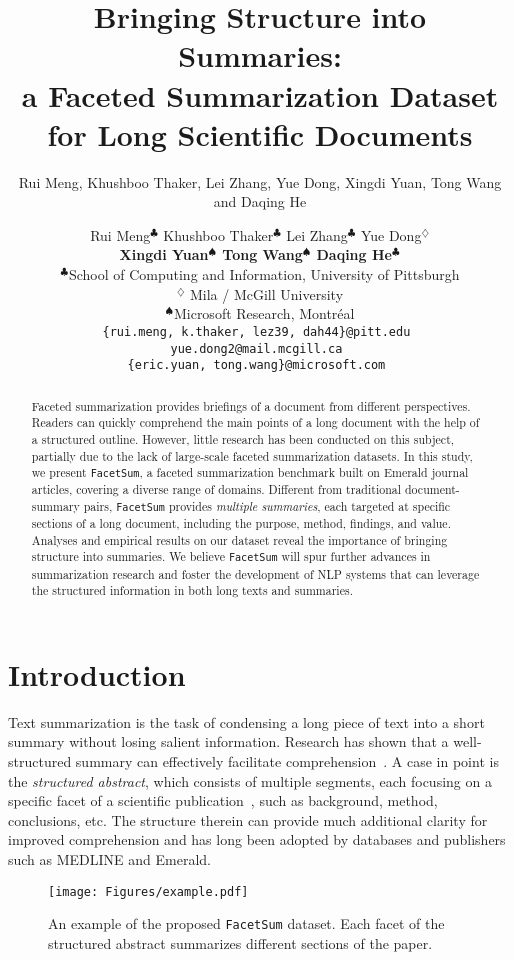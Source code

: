 \documentclass[11pt,a4paper]{article}
\title{Bringing Structure into Summaries: \\ a Faceted Summarization Dataset for Long Scientific Documents}
\author{Rui Meng, Khushboo Thaker, Lei Zhang, Yue Dong, Xingdi Yuan, Tong Wang and Daqing He}
\author{Rui Meng$^\clubsuit$ \:\:\:\: Khushboo Thaker$^{\clubsuit}$ \:\:\:\: Lei Zhang$^{\clubsuit}$ \:\:\:\: Yue Dong$^{\diamondsuit}$ \:\:\:\: \\ \textbf{Xingdi Yuan$^\spadesuit$ \:\:\:\: Tong Wang$^{\spadesuit}$ \:\:\:\: Daqing He}$^{\clubsuit}$\\
$^\clubsuit$School of Computing and Information, University of Pittsburgh \\
$^\diamondsuit$ Mila / McGill University \\
$^\spadesuit$Microsoft Research, Montr\'{e}al \\
{\small \tt \{rui.meng, k.thaker, lez39, dah44\}@pitt.edu } \\
{\small \tt yue.dong2@mail.mcgill.ca } \\
{\small \tt \{eric.yuan, tong.wang\}@microsoft.com }
}
\date{}
\newcommand{\ours}{\texttt{FacetSum}\xspace}
\begin{document}
\maketitle

\begin{abstract}
Faceted summarization provides briefings of a document from different perspectives. Readers can quickly comprehend the main points of a long document with the help of a structured outline. However, little research has been conducted on this subject, partially due to the lack of large-scale faceted summarization datasets.
In this study, we present \ours, a faceted summarization benchmark built on Emerald journal articles, covering a diverse range of domains.
Different from traditional document-summary pairs, \ours provides \textit{multiple summaries}, each targeted at specific sections
of a long document, including the purpose, method, findings, and value.
Analyses and empirical results on our dataset reveal the importance of bringing structure into summaries.
We believe \ours will spur further advances in summarization research and foster the development of NLP systems that can leverage the structured information in both long texts and summaries.






\end{abstract}

\section{Introduction}
\label{section:intro}








Text summarization is the task of condensing a long piece of text into a short summary without losing salient information.
Research has shown that a well-structured summary 
can effectively facilitate comprehension~\cite{hartley1996obtaining,hartley1997structured}.
A case in point is the \textit{structured abstract}, which consists of multiple segments, each focusing on a specific facet of a scientific publication~\cite{hartley2014current}, such as background, method, conclusions, etc.
The structure therein can provide much additional clarity for improved comprehension and  has long been adopted by databases and publishers such as MEDLINE and Emerald.


\begin{figure}[t!]
    \centering
    \texttt{[image: Figures/example.pdf]}
    \caption{An example of the proposed \ours dataset. Each facet of the structured abstract summarizes different sections of the paper.
    }
    \label{fig:example}
\end{figure}
\end{document}
